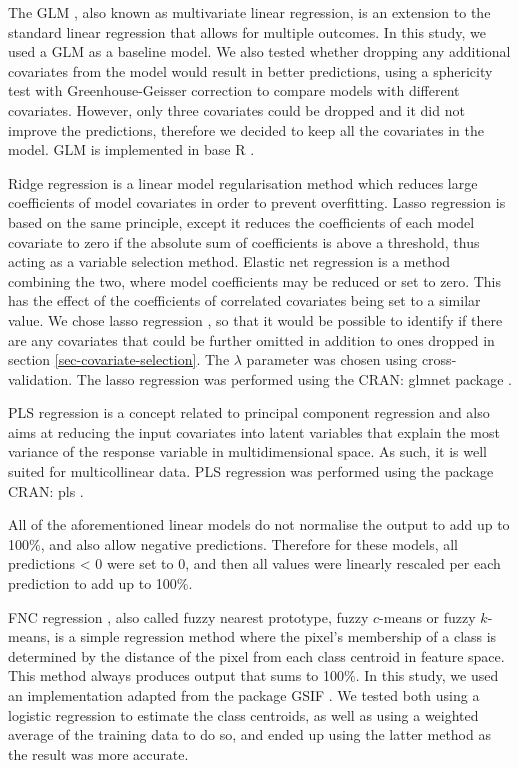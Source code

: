 \documentclass[review,authoryear,3p]{elsarticle}
\newcommand{\cran}[1]{CRAN: #1}
\begin{document}
The \gls{GLM} \citep{neter_applied_1996}, also known as multivariate linear regression, is an extension to the standard linear regression that allows for multiple outcomes.
In this study, we used a \gls{GLM} as a baseline model.
We also tested whether dropping any additional covariates from the model would result in better predictions, using a sphericity test with Greenhouse-Geisser correction \citep{greenhouse_methods_1959} to compare models with different covariates.
However, only three covariates could be dropped and it did not improve the predictions, therefore we decided to keep all the covariates in the model.
\Gls{GLM} is implemented in base R \citep{r_2019}.

Ridge regression is a linear model regularisation method which reduces large coefficients of model covariates in order to prevent overfitting.
Lasso regression is based on the same principle, except it reduces the coefficients of each model covariate to zero if the absolute sum of coefficients is above a threshold, thus acting as a variable selection method.
Elastic net regression is a method combining the two, where model coefficients may be reduced or set to zero.
This has the effect of the coefficients of correlated covariates being set to a similar value.
We chose lasso regression \citep{tibshirani_regression_1996}, so that it would be possible to identify if there are any covariates that could be further omitted in addition to ones dropped in section \ref{sec-covariate-selection}.
The $\lambda$ parameter was chosen using cross-validation.
The lasso regression was performed using the \cran{glmnet} package \citep{glmnet}.

\Gls{PLS} regression \citep{wold_pls-regression_2001} is a concept related to principal component regression and also aims at reducing the input covariates into latent variables that explain the most variance of the response variable in multidimensional space.
As such, it is well suited for multicollinear data.
\ac{PLS} regression was performed using the package \cran{pls} \citep{pls}.

All of the aforementioned linear models do not normalise the output to add up to 100\%, and also allow negative predictions.
Therefore for these models, all predictions < 0 were set to 0, and then all values were linearly rescaled per each prediction to add up to 100\%.

\Gls{FNC} regression \citep{keller_fuzzy_1985}, also called fuzzy nearest prototype, fuzzy $c$-means or fuzzy $k$-means, is a simple regression method where the pixel's membership of a class is determined by the distance of the pixel from each class centroid in feature space.
This method always produces output that sums to 100\%.
In this study, we used an implementation adapted from the package GSIF \citep{hengl2004fuzzycmeans}.
We tested both using a logistic regression to estimate the class centroids, as well as using a weighted average of the training data to do so, and ended up using the latter method as the result was more accurate.
\end{document}
